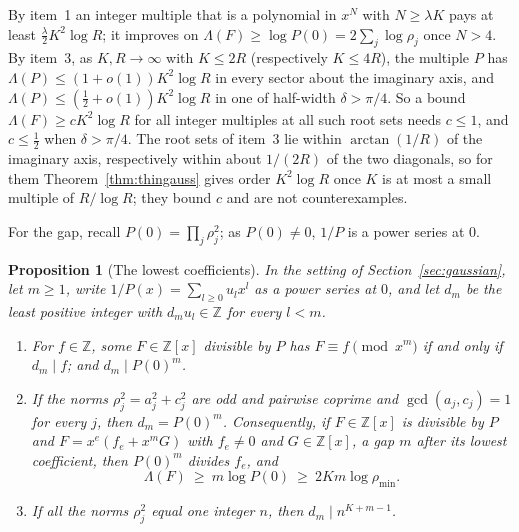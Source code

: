 \documentclass[11pt]{article}
\newtheorem{proposition}[theorem]{Proposition}
\begin{document}
By item~1 an integer multiple that is a polynomial in $x^N$ with
$N\ge\lambda K$ pays at least $\frac\lambda2K^2\log R$; it improves on
$\Lambda(F)\ge\log P(0)=2\sum_j\log\rho_j$ once $N>4$.  By item~3, as
$K,R\to\infty$ with $K\le2R$ (respectively $K\le4R$), the multiple $P$ has
$\Lambda(P)\le(1+o(1))K^2\log R$ in every sector about the imaginary axis,
and $\Lambda(P)\le(\frac12+o(1))K^2\log R$ in one of half-width
$\delta>\pi/4$.  So a bound $\Lambda(F)\ge cK^2\log R$ for all integer
multiples at all such root sets needs $c\le1$, and $c\le\frac12$ when
$\delta>\pi/4$.  The root sets of item~3 lie within $\arctan(1/R)$ of the
imaginary axis, respectively within about $1/(2R)$ of the two diagonals, so
for them Theorem~\ref{thm:thingauss} gives order $K^2\log R$ once $K$ is
at most a small multiple of $R/\log R$; they bound $c$ and are not counterexamples.

For the gap, recall $P(0)=\prod_j\rho_j^2$; as $P(0)\ne0$, $1/P$ is a power
series at $0$.

\begin{proposition}[The lowest coefficients]\label{prop:gausslow}
In the setting of Section~\ref{sec:gaussian}, let $m\ge1$, write
$1/P(x)=\sum_{l\ge0}u_lx^l$ as a power series at $0$, and let $d_m$ be the
least positive integer with $d_mu_l\in\mathbb Z$ for every $l<m$.
\begin{enumerate}
\item For $f\in\mathbb Z$, some $F\in\mathbb Z[x]$ divisible by $P$ has
$F\equiv f\pmod{x^m}$ if and only if $d_m\mid f$; and $d_m\mid P(0)^m$.
\item If the norms $\rho_j^2=a_j^2+c_j^2$ are odd and pairwise coprime and
$\gcd(a_j,c_j)=1$ for every $j$, then $d_m=P(0)^m$.  Consequently, if
$F\in\mathbb Z[x]$ is divisible by $P$ and $F=x^e(f_e+x^mG)$ with $f_e\ne0$
and $G\in\mathbb Z[x]$, a gap $m$ after its lowest coefficient, then $P(0)^m$
divides $f_e$, and
\[
  \Lambda(F)\ \ge\ m\log P(0)\ \ge\ 2Km\log\rho_{\min}.
\]
\item If all the norms $\rho_j^2$ equal one integer $n$, then
$d_m\mid n^{K+m-1}$.
\end{enumerate}
\end{proposition}
\end{document}
